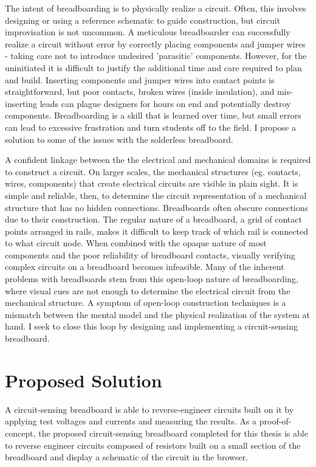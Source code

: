 \documentclass[11pt,twoside]{mitthesis}
\begin{document}
The intent of breadboarding is to physically realize a circuit.
Often, this involves designing or using a reference schematic to guide construction, but circuit improvisation is not uncommon.  
A meticulous breadboarder can successfully realize a circuit without error by correctly placing components and jumper wires - taking care not to introduce undesired 'parasitic' components.  
However, for the uninitiated it is difficult to justify the additional time and care required to plan and build.
Inserting components and jumper wires into contact points is straightforward, but poor contacts, broken wires (inside insulation), and mis-inserting leads can plague designers for hours on end and potentially destroy components.
Breadboarding is a skill that is learned over time, but small errors can lead to excessive frustration and turn students off to the field.
I propose a solution to some of the issues with the solderless breadboard.

A confident linkage between the the electrical and mechanical domains is required to construct a circuit.
On larger scales, the mechanical structures (eg. contacts, wires, components) that create electrical circuits are visible in plain sight.
It is simple and reliable, then, to determine the circuit representation of a mechanical structure that has no hidden connections.
Breadboards often obscure connections due to their construction.
The regular nature of a breadboard, a grid of contact points arranged in rails, makes it difficult to keep track of which rail is connected to what circuit node.
When combined with the opaque nature of most components and the poor reliability of breadboard contacts, visually verifying complex circuits on a breadboard becomes infeasible.
Many of the inherent problems with breadboards stem from this open-loop nature of breadboarding, where visual cues are not enough to determine the electrical circuit from the mechanical structure.
A symptom of open-loop construction techniques is a mismatch between the mental model and the physical realization of the system at hand.
I seek to close this loop by designing and implementing a circuit-sensing breadboard.

\section{Proposed Solution}

A circuit-sensing breadboard is able to reverse-engineer circuits built on it by applying test voltages and currents and measuring the results.  
As a proof-of-concept, the proposed circuit-sensing breadboard completed for this thesis is able to reverse engineer circuits composed of resistors built on a small section of the breadboard and display a schematic of the circuit in the browser.
\end{document}
